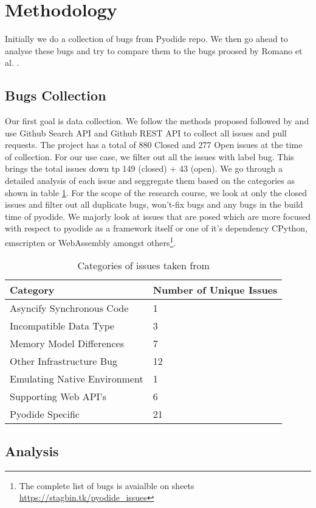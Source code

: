 \section{Methodology}
Initially we do a collection of bugs from Pyodide repo. We then go ahead to analyse these bugs and try to compare them to the bugs proosed by Romano et al. \cite{bugsinwasm}. 

\subsection{Bugs Collection}
Our first goal is data collection. We follow the methods proposed followed by \cite{bugsinwasm} and use Github Search API\cite{githubsearchapi} and Github REST API\cite{githubrestapi} to collect all issues and pull requests. The project has a total of 880 Closed and 277 Open issues at the time of collection. For our use case, we filter out all the issues with label bug. This brings the total issues down tp 149 (closed) + 43 (open). We go through a detailed analysis of each issue and seggregate them based on the categories as shown in table \ref{tab:categories_bugs}. For the scope of the research course, we look at only the closed issues and filter out all duplicate bugs, won't-fix bugs and any bugs in the build time of pyodide. We majorly look at issues that are posed which are more focused with respect to pyodide as a framework itself or one of it's dependency CPython, emscripten or WebAssembly amongst others\footnote{The complete list of bugs is avaialble on sheets \url{https://stagbin.tk/pyodide_issues}}.

\begin{table}[]
    \begin{tabular}{|l|l|}
        \hline
        \textbf{Category}               & \textbf{Number of Unique Issues}  \\ \hline
        Asyncify Synchronous Code       &           1                       \\ \hline
        Incompatible Data Type          &           3                       \\ \hline
        Memory Model Differences        &           7                       \\ \hline
        Other Infrastructure Bug        &           12                      \\ \hline
        Emulating Native Environment    &           1                       \\ \hline
        Supporting Web API's            &           6                       \\ \hline
        Pyodide Specific                &           21                      \\ \hline
    \end{tabular}
\caption{Categories of issues taken from \cite{bugsinwasm}}
\label{tab:categories_bugs}
\end{table}

\subsection{Analysis}
